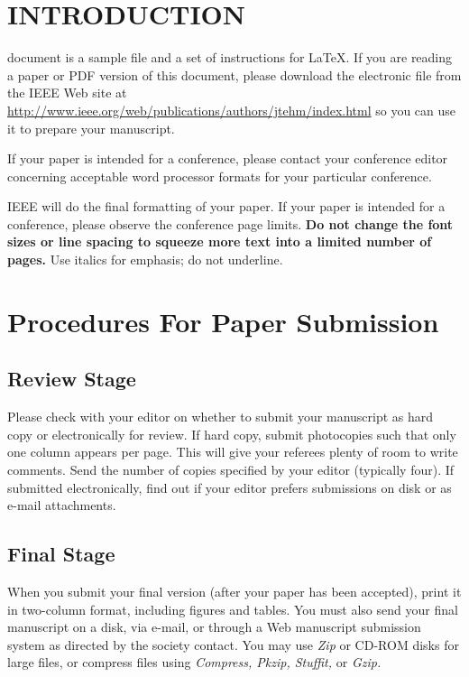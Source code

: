\documentclass[transmag]{IEEEtran}
\begin{document}
\maketitle

\section{INTRODUCTION}

 document is a sample file and a set of
instructions for \LaTeX. If you are 
reading a paper or PDF version of this document, please download the 
electronic file from the IEEE Web site at 
\href{http://www.ieee.org/web/publications/authors/jtehm/index.html}
{http://www.ieee.org/web/publications/authors/jtehm/index.html}
so you can use it to prepare your manuscript.

If your paper is intended for a conference, please contact your conference 
editor concerning acceptable word processor formats for your particular 
conference. 

IEEE will do the final formatting of your paper. If your paper is intended 
for a conference, please observe the conference page limits. 
\textbf{Do not change the font sizes or 
line spacing to squeeze more text into a limited number of pages.} Use 
italics for emphasis; do not underline. 

\section{Procedures For Paper Submission}
\subsection{Review Stage}
Please check with your editor on whether to submit your manuscript as hard 
copy or electronically for review. If hard copy, submit photocopies such 
that only one column appears per page. This will give your referees plenty 
of room to write comments. Send the number of copies specified by your 
editor (typically four). If submitted electronically, find out if your 
editor prefers submissions on disk or as e-mail attachments.

\subsection{Final Stage}
When you submit your final version (after your paper has been accepted), 
print it in two-column format, including figures and tables. You must also 
send your final manuscript on a disk, via e-mail, or through a Web 
manuscript submission system as directed by the society contact. You may use 
\emph{Zip} or CD-ROM disks for large files, or compress files using \emph{Compress, Pkzip, Stuffit,} or \emph{Gzip.} 
\end{document}
